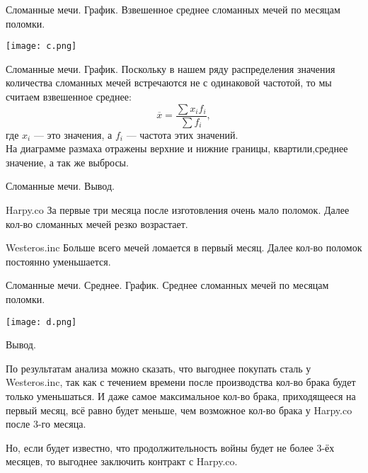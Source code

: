 \documentclass{beamer}
\begin{document}
	\begin{frame}{Сломанные мечи. График.}
	Взвешенное среднее сломанных мечей по месяцам поломки.
		\begin{center}
		\texttt{[image: c.png]}
		\end{center}
	\end{frame}

	\begin{frame}{Сломанные мечи. График.}
	Поскольку в нашем ряду распределения значения количества сломанных мечей встречаются не с одинаковой частотой, то мы считаем взвешенное среднее:
	\[\overline{x} = \frac{\sum{x_i f_i}}{\sum{f_i}},\]
	где $x_i$ --- это значения, а $f_i$ --- частота этих значений. \\
	
	На диаграмме размаха отражены верхние и нижние границы, квартили,среднее значение, а так же выбросы.
	\end{frame}

	\begin{frame}{Сломанные мечи. Вывод.}
		\begin{block}{Harpy.co}
			За первые три месяца после изготовления очень мало поломок.
			Далее кол-во сломанных мечей резко возрастает.
		\end{block}
		\begin{block}{Westeros.inc}
			Больше всего мечей ломается в первый месяц.
			Далее кол-во поломок постоянно уменьшается.
		\end{block}
	\end{frame}

	\begin{frame}{Сломанные мечи. Среднее. График.}
	Среднее сломанных мечей по месяцам поломки.
		\begin{center}
			\texttt{[image: d.png]}
		\end{center}
	\end{frame}

	\begin{frame}{Вывод.}
		\begin{block}{}
			По результатам анализа можно сказать, что выгоднее покупать сталь у Westeros.inc, так как с течением времени после производства кол-во брака будет только уменьшаться. И даже самое максимальное кол-во брака, приходящееся на первый месяц, всё равно будет меньше, чем возможное кол-во брака у Harpy.co после 3-го месяца.
		\end{block}
		\begin{block}{}
			Но, если будет известно, что продолжительность войны будет не более 3-ёх месяцев, то выгоднее заключить контракт с Harpy.co.
		\end{block}
	\end{frame}
\end{document}
